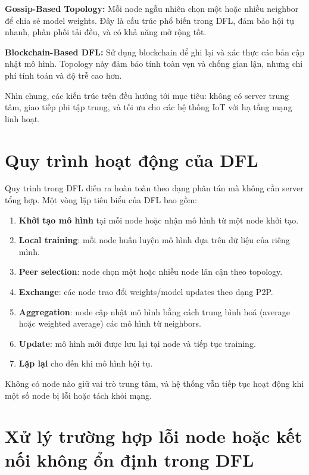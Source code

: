 \textbf{Gossip-Based Topology:}  
Mỗi node ngẫu nhiên chọn một hoặc nhiều neighbor để chia sẻ model weights. 
Đây là cấu trúc phổ biến trong DFL, đảm bảo hội tụ nhanh, phân phối tải đều, 
và có khả năng mở rộng tốt.

\textbf{Blockchain-Based DFL:}  
Sử dụng blockchain để ghi lại và xác thực các bản cập nhật mô hình. Topology này 
đảm bảo tính toàn vẹn và chống gian lận, nhưng chi phí tính toán và độ trễ cao hơn.

Nhìn chung, các kiến trúc trên đều hướng tới mục tiêu: không có server trung tâm, 
giao tiếp phi tập trung, và tối ưu cho các hệ thống IoT với hạ tầng mạng linh hoạt.

\section{Quy trình hoạt động của DFL}

\hspace{0.6cm}Quy trình trong DFL diễn ra hoàn toàn theo dạng phân tán mà không cần 
server tổng hợp. Một vòng lặp tiêu biểu của DFL bao gồm:

\begin{enumerate}
    \item \textbf{Khởi tạo mô hình} tại mỗi node hoặc nhận mô hình từ một node khởi tạo.
    \item \textbf{Local training}: mỗi node huấn luyện mô hình dựa trên dữ liệu của riêng mình.
    \item \textbf{Peer selection}: node chọn một hoặc nhiều node lân cận theo topology.
    \item \textbf{Exchange}: các node trao đổi weights/model updates theo dạng P2P.
    \item \textbf{Aggregation}: node cập nhật mô hình bằng cách trung bình hoá 
    (average hoặc weighted average) các mô hình từ neighbors.
    \item \textbf{Update}: mô hình mới được lưu lại tại node và tiếp tục training.
    \item \textbf{Lặp lại} cho đến khi mô hình hội tụ.
\end{enumerate}

Không có node nào giữ vai trò trung tâm, và hệ thống vẫn tiếp tục hoạt động khi 
một số node bị lỗi hoặc tách khỏi mạng.

\section{Xử lý trường hợp lỗi node hoặc kết nối không ổn định trong DFL}

